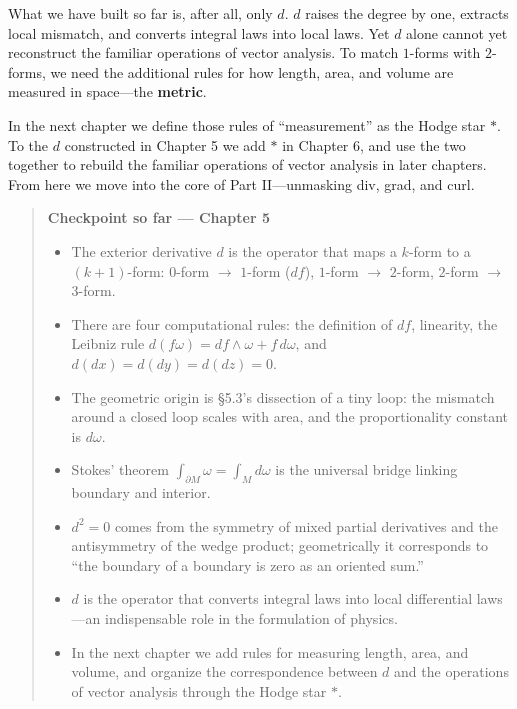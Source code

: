 \documentclass[a4paper,12pt,openany]{book}
\begin{document}
What we have built so far is, after all, only \(d\). \(d\) raises the
degree by one, extracts local mismatch, and converts integral laws into
local laws. Yet \(d\) alone cannot yet reconstruct the familiar
operations of vector analysis. To match \(1\)-forms with \(2\)-forms, we
need the additional rules for how length, area, and volume are measured
in space—the \textbf{metric}.

In the next chapter we define those rules of ``measurement'' as the
Hodge star \(\ast\). To the \(d\) constructed in Chapter 5 we add
\(\ast\) in Chapter 6, and use the two together to rebuild the familiar
operations of vector analysis in later chapters. From here we move into
the core of Part II—unmasking div, grad, and curl.

\par\vspace{0.35em}\par

\begin{quote}
\textbf{Checkpoint so far — Chapter 5}

\begin{itemize}
\item
  The exterior derivative \(d\) is the operator that maps a \(k\)-form
  to a \((k+1)\)-form: \(0\)-form \(\to\) \(1\)-form (\(df\)),
  \(1\)-form \(\to\) \(2\)-form, \(2\)-form \(\to\) \(3\)-form.
\item
  There are four computational rules: the definition of \(df\),
  linearity, the Leibniz rule
  \(d(f\omega) = df\wedge\omega + f\,d\omega\), and
  \(d(dx)=d(dy)=d(dz)=0\).
\item
  The geometric origin is §5.3's dissection of a tiny loop: the mismatch
  around a closed loop scales with area, and the proportionality
  constant is \(d\omega\).
\item
  Stokes' theorem \(\int_{\partial M} \omega = \int_M d\omega\) is the
  universal bridge linking boundary and interior.
\item
  \(d^2 = 0\) comes from the symmetry of mixed partial derivatives and
  the antisymmetry of the wedge product; geometrically it corresponds to
  ``the boundary of a boundary is zero as an oriented sum.''
\item
  \(d\) is the operator that converts integral laws into local
  differential laws—an indispensable role in the formulation of
  physics.
\item
  In the next chapter we add rules for measuring length, area, and
  volume, and organize the correspondence between \(d\) and the
  operations of vector analysis through the Hodge star \(\ast\).
\end{itemize}
\end{quote}
\end{document}
